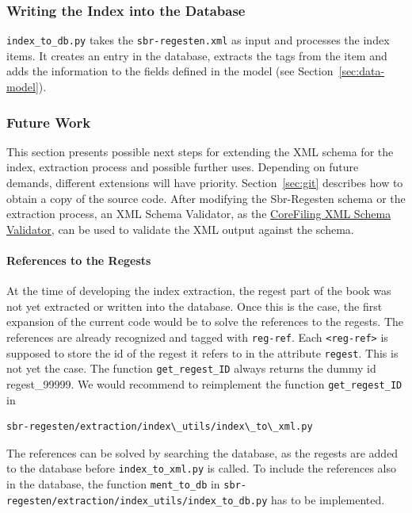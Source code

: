 \subsubsection{Writing the Index into the Database}
\texttt{index\_to\_db.py} takes the \texttt{sbr-regesten.xml} as input and processes the index items. It creates an entry in the database, extracts the tags from the item and adds the information to the fields defined in the model (see Section~\ref{sec:data-model}).




\subsubsection{Future Work}

This section presents possible next steps for extending the XML schema for the index, extraction process and possible further uses. Depending on future demands, different extensions will have priority.  Section~\ref{sec:git} describes how to obtain a copy of the source code. After modifying the Sbr-Regesten schema or the extraction process, an XML Schema Validator, as the \href{http://corefiling.com/opensource/schemaValidate.html} {CoreFiling XML Schema Validator}, can be used to validate the XML output against the schema.

\paragraph{References to the Regests}
At the time of developing the index extraction, the regest part of the book was not yet extracted or written into the database. Once this is the case, the first expansion of the current code would be to solve the references to the regests. The references are already recognized and tagged with \texttt{reg-ref}. Each \texttt{<reg-ref>} is supposed to store the id of the regest it refers to in the attribute \texttt{regest}. This is not yet the case. The function \texttt{get\_regest\_ID} always returns the dummy id regest\_99999. We would recommend to reimplement the function \texttt{get\_regest\_ID} in 

\begin{verbatim}
sbr-regesten/extraction/index\_utils/index\_to\_xml.py
\end{verbatim}

The references can be solved by searching the database, as the regests are added to the database before \texttt{index\_to\_xml.py} is called. To include the references also in the database, the function \texttt{ment\_to\_db} in \texttt{sbr-regesten/extraction/index\_utils/index\_to\_db.py} has to be implemented.

